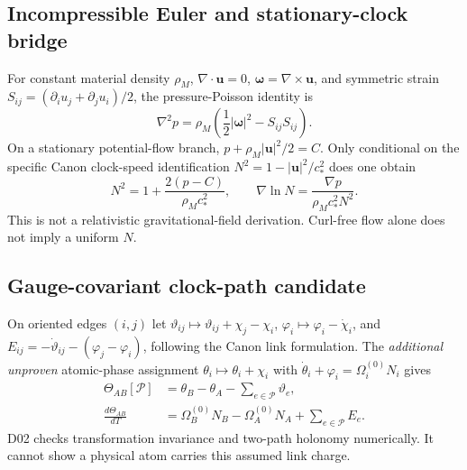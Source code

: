 \documentclass[10pt,a4paper]{article}
\newcommand{\uvec}{\mathbf u}
\newcommand{\wvec}{\boldsymbol\omega}
\begin{document}
\subsection{Incompressible Euler and stationary-clock bridge}
For constant material density $\rho_M$, $\nabla\cdot\uvec=0$, $\wvec=\nabla\times\uvec$, and symmetric strain $S_{ij}=(\partial_i u_j+\partial_j u_i)/2$, the pressure-Poisson identity is
\begin{equation}
\nabla^2p=\rho_M\left(\frac12|\wvec|^2-S_{ij}S_{ij}\right).
\end{equation}
On a stationary potential-flow branch, $p+\rho_M|\uvec|^2/2=C$. Only conditional on the specific Canon clock-speed identification $N^2=1-|\uvec|^2/c_*^2$ does one obtain
\begin{equation}
N^2=1+\frac{2(p-C)}{\rho_Mc_*^2},\qquad \nabla\ln N=\frac{\nabla p}{\rho_Mc_*^2N^2}.
\end{equation}
This is not a relativistic gravitational-field derivation. Curl-free flow alone does not imply a uniform $N$.

\subsection{Gauge-covariant clock-path candidate}
On oriented edges $(i,j)$ let $\vartheta_{ij}\mapsto\vartheta_{ij}+\chi_j-\chi_i$, $\varphi_i\mapsto\varphi_i-\dot\chi_i$, and $E_{ij}=-\dot\vartheta_{ij}-(\varphi_j-\varphi_i)$, following the Canon link formulation. The \emph{additional unproven} atomic-phase assignment $\theta_i\mapsto\theta_i+\chi_i$ with $\dot\theta_i+\varphi_i=\Omega_i^{(0)}N_i$ gives
\begin{align}
\Theta_{AB}[\mathcal P]&=\theta_B-\theta_A-\sum_{e\in\mathcal P}\vartheta_e,\\
\frac{d\Theta_{AB}}{dT}&=\Omega_B^{(0)}N_B-\Omega_A^{(0)}N_A+\sum_{e\in\mathcal P}E_e.
\end{align}
D02 checks transformation invariance and two-path holonomy numerically. It cannot show a physical atom carries this assumed link charge.
\end{document}
